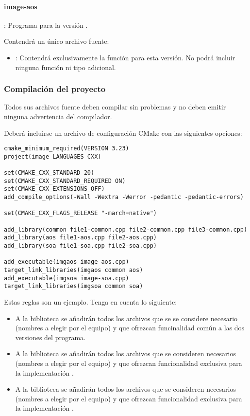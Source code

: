 \paragraph{image-aos}: Programa para la versión .

Contendrá un único archivo fuente:
\begin{itemize}
  \item {}: Contendrá exclusivamente la función
         para esta versión.
        No podrá incluir ninguna función ni tipo adicional.
\end{itemize}

\subsubsection{Compilación del proyecto}

Todos sus archivos fuente deben compilar sin problemas y no deben emitir
ninguna advertencia del compilador. 

Deberá incluirse un archivo de configuración
CMake con las siguientes opciones:

\begin{lstlisting}[title={CmakeLists.txt},frame=single]
cmake_minimum_required(VERSION 3.23)
project(image LANGUAGES CXX)

set(CMAKE_CXX_STANDARD 20)
set(CMAKE_CXX_STANDARD_REQUIRED ON)
set(CMAKE_CXX_EXTENSIONS_OFF)
add_compile_options(-Wall -Wextra -Werror -pedantic -pedantic-errors)

set(CMAKE_CXX_FLAGS_RELEASE "-march=native")

add_library(common file1-common.cpp file2-common.cpp file3-common.cpp)
add_library(aos file1-aos.cpp file2-aos.cpp)
add_library(soa file1-soa.cpp file2-soa.cpp)

add_executable(imgaos image-aos.cpp)
target_link_libraries(imgaos common aos)
add_executable(imgsoa image-soa.cpp)
target_link_libraries(imgsoa common soa)
\end{lstlisting}

Estas reglas son un ejemplo. Tenga en cuenta lo siguiente:
\begin{itemize}

  \item A la biblioteca  se añadirán todos los archivos 
        que se se considere necesario (nombres a elegir por el equipo) y que ofrezcan
        funcinalidad común a las dos versiones del programa.

  \item A la biblioteca  se añadirán todos los archivos 
        que se consideren necesarios (nombres a elegir por el equipo) y que ofrezcan 
        funcionalidad exclusiva para la implementación .

  \item A la biblioteca  se añadirán todos los archivos 
        que se consideren necesarios (nombres a elegir por el equipo) y que ofrezcan 
        funcionalidad exclusiva para la implementación .

\end{itemize}


